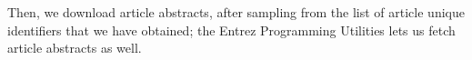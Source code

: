 Then, we download article abstracts, after sampling from the list of article
unique identifiers that we have obtained; the Entrez Programming Utilities
lets us fetch article abstracts as well.
